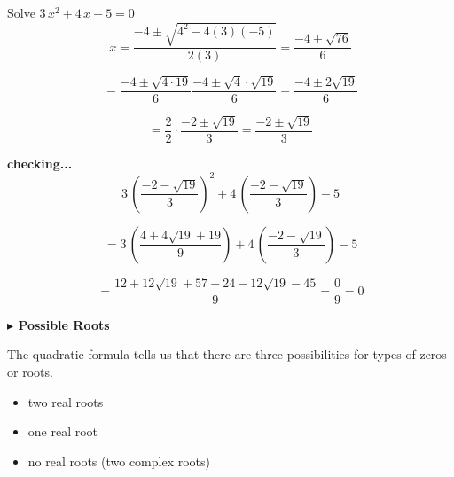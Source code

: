 \documentclass{ximera}
\begin{document}
\begin{example}


Solve $3 \, x^2 + 4 \, x - 5 = 0$ \\


\[
x = \frac{-4 \pm \sqrt{4^2 - 4 (3)(-5)}}{2(3)} = \frac{-4 \pm \sqrt{76}}{6}
\]

\[
= \frac{-4 \pm \sqrt{4 \cdot 19}}{6} \frac{-4 \pm \sqrt{4} \cdot \sqrt{19}}{6} = \frac{-4 \pm 2\sqrt{19}}{6}
\]

\[
= \frac{2}{2} \cdot \frac{-2 \pm \sqrt{19}}{3} = \frac{-2 \pm \sqrt{19}}{3}
\]



\textbf{checking...} \\


\[
3 \, \left( \frac{-2 - \sqrt{19}}{3} \right)^2 + 4 \, \left( \frac{-2 - \sqrt{19}}{3} \right) - 5 
\]

\[
=  3 \, \left( \frac{4 + 4\sqrt{19}+19}{9} \right) + 4 \, \left( \frac{-2 - \sqrt{19}}{3} \right) - 5
\]


\[
= \frac{12 + 12\sqrt{19} + 57 - 24 - 12\sqrt{19} - 45}{9} = \frac{0}{9} = 0
\]

\end{example}





\textbf{\textcolor{blue!55!black}{$\blacktriangleright$ Possible Roots}} 


The quadratic formula tells us that there are three possibilities for types of zeros or roots.


\begin{itemize}
\item two real roots
\item one real root
\item no real roots (two complex roots)
\end{itemize}
\end{document}
